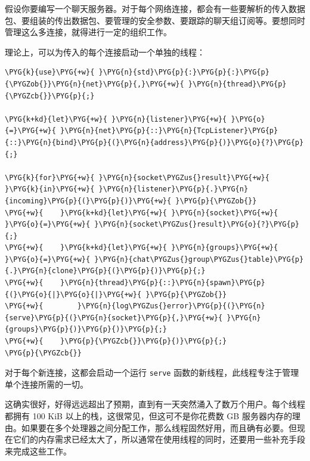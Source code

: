 
假设你要编写一个聊天服务器。对于每个网络连接，都会有一些要解析的传入数据包、要组装的传出数据包、要管理的安全参数、要跟踪的聊天组订阅等。要想同时管理这么多连接，就得进行一定的组织工作。

理论上，可以为传入的每个连接启动一个单独的线程：

\begin{Verbatim}[commandchars=\\\{\},breaklines=true,breakanywhere=true,fontsize=\codefont,xleftmargin=17bp]
\PYG{k}{use}\PYG{+w}{ }\PYG{n}{std}\PYG{p}{:}\PYG{p}{:}\PYG{p}{\PYGZob{}}\PYG{n}{net}\PYG{p}{,}\PYG{+w}{ }\PYG{n}{thread}\PYG{p}{\PYGZcb{}}\PYG{p}{;}

\PYG{k+kd}{let}\PYG{+w}{ }\PYG{n}{listener}\PYG{+w}{ }\PYG{o}{=}\PYG{+w}{ }\PYG{n}{net}\PYG{p}{::}\PYG{n}{TcpListener}\PYG{p}{::}\PYG{n}{bind}\PYG{p}{(}\PYG{n}{address}\PYG{p}{)}\PYG{o}{?}\PYG{p}{;}

\PYG{k}{for}\PYG{+w}{ }\PYG{n}{socket\PYGZus{}result}\PYG{+w}{ }\PYG{k}{in}\PYG{+w}{ }\PYG{n}{listener}\PYG{p}{.}\PYG{n}{incoming}\PYG{p}{(}\PYG{p}{)}\PYG{+w}{ }\PYG{p}{\PYGZob{}}
\PYG{+w}{    }\PYG{k+kd}{let}\PYG{+w}{ }\PYG{n}{socket}\PYG{+w}{ }\PYG{o}{=}\PYG{+w}{ }\PYG{n}{socket\PYGZus{}result}\PYG{o}{?}\PYG{p}{;}
\PYG{+w}{    }\PYG{k+kd}{let}\PYG{+w}{ }\PYG{n}{groups}\PYG{+w}{ }\PYG{o}{=}\PYG{+w}{ }\PYG{n}{chat\PYGZus{}group\PYGZus{}table}\PYG{p}{.}\PYG{n}{clone}\PYG{p}{(}\PYG{p}{)}\PYG{p}{;}
\PYG{+w}{    }\PYG{n}{thread}\PYG{p}{::}\PYG{n}{spawn}\PYG{p}{(}\PYG{o}{|}\PYG{o}{|}\PYG{+w}{ }\PYG{p}{\PYGZob{}}
\PYG{+w}{        }\PYG{n}{log\PYGZus{}error}\PYG{p}{(}\PYG{n}{serve}\PYG{p}{(}\PYG{n}{socket}\PYG{p}{,}\PYG{+w}{ }\PYG{n}{groups}\PYG{p}{)}\PYG{p}{)}\PYG{p}{;}
\PYG{+w}{    }\PYG{p}{\PYGZcb{}}\PYG{p}{)}\PYG{p}{;}
\PYG{p}{\PYGZcb{}}
\end{Verbatim}

对于每个新连接，这都会启动一个运行 \texttt{serve} 函数的新线程，此线程专注于管理单个连接所需的一切。

这确实很好，好得远远超出了预期，直到有一天突然涌入了数万个用户。每个线程都拥有 100 KiB 以上的栈，这很常见，但这可不是你花费数 GB 服务器内存的理由。如果要在多个处理器之间分配工作，那么线程固然好用，而且确有必要。但现在它们的内存需求已经太大了，所以通常在使用线程的同时，还要用一些补充手段来完成这些工作。

